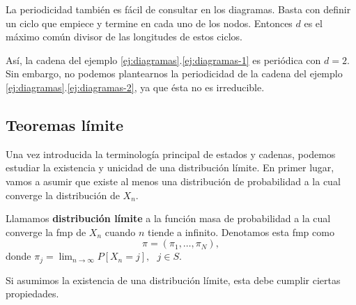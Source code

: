 \begin{observacion}
    La periodicidad también es fácil de consultar en los diagramas. Basta con definir un ciclo que empiece y termine en cada uno de los nodos. Entonces $d$ es el máximo común divisor de las longitudes de estos ciclos.
\end{observacion}

Así, la cadena del ejemplo \ref{ej:diagramas}.\ref{ej:diagramas-1} es periódica con $d=2$. Sin embargo, no podemos plantearnos la periodicidad de la cadena del ejemplo \ref{ej:diagramas}.\ref{ej:diagramas-2}, ya que ésta no es irreducible.


\subsection{Teoremas límite}

Una vez introducida la terminología principal de estados y cadenas, podemos estudiar la existencia y unicidad de una distribución límite. En primer lugar, vamos a asumir que existe al menos una distribución de probabilidad a la cual converge la distribución de $X_n$.

\begin{definicion}
    Llamamos \textbf{distribución límite} a la función masa de probabilidad a la cual converge la fmp de $X_n$ cuando $n$ tiende a infinito. Denotamos esta fmp como
    \begin{equation}
        \label{eq:distr-limite}
        \pi = (\pi_1,\dots,\pi_N)   ,
    \end{equation}
    donde $\pi_j=\displaystyle\lim_{n\rightarrow\infty} P[X_n=j], \ \ \ j\in S$.
\end{definicion}

Si asumimos la existencia de una distribución límite, esta debe cumplir ciertas propiedades.

